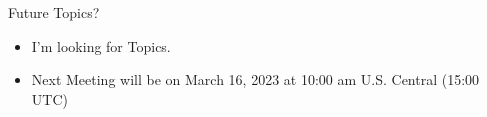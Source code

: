 \documentclass{beamer}
\begin{document}
\begin{frame}{Future Topics?}
  \begin{itemize}
    \item I'm looking for Topics.
    \item Next Meeting will be on March 16, 2023 at 10:00 am
      U.S. Central (15:00 UTC)
  \end{itemize}
\end{frame}

%
\end{document}
